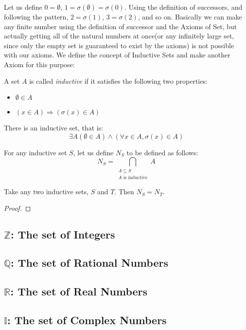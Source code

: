 \documentclass{report}
\begin{document}
		Let us define $0=\emptyset$, $1=\sigma(\emptyset)=\sigma(0)$. Using the definition of successors, and following the pattern, $2=\sigma(1)$, $3=\sigma(2)$, and so on. Basically we can make any finite number using the definition of successor and the Axioms of Set, but actually getting all of the natural numbers at once(or any infinitely large set, since only the empty set is guaranteed to exist by the axioms) is not possible with our axioms. We define the concept of Inductive Sets and make another Axiom for this purpose:
	
		\begin{defn} \label{defn_inductive_set}
			A set $A$ is called \emph{inductive} if it satisfies the following two properties:
			\begin{itemize}
				\item $\emptyset \in A$
				\item $(x \in A) \Rightarrow (\sigma(x) \in A)$
			\end{itemize}
		\end{defn}
		
		\begin{axiom} \label{axiom_infinity}
			There is an inductive set, that is:
			\begin{displaymath}
				\exists A (\emptyset \in A) \wedge (\forall x \in A, \sigma(x) \in A)
			\end{displaymath}
		\end{axiom}
	
		For any inductive set $S$, let us define $N_S$ to be defined as follows:
		\begin{displaymath}
			N_S=\bigcap_{\substack{A \subseteq S\\A \text{ is inductive}}}A
		\end{displaymath}

		\begin{thm}
			Take any two inductive sets, $S$ and $T$. Then $N_S=N_T$.
		\end{thm}
	
		\begin{proof}
		\end{proof}

		\subsection{$\mathbb{Z}$: The set of Integers}
		\subsection{$\mathbb{Q}$: The set of Rational Numbers}
		\subsection{$\mathbb{R}$: The set of Real Numbers}
		\subsection{$\mathbb{I}$: The set of Complex Numbers}
\end{document}
